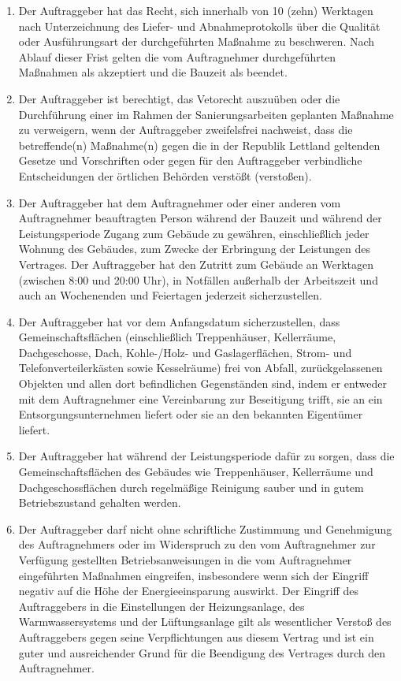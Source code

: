 \begin{multicols}{2}
\begin{enumerate}
   \item Der Auftraggeber hat das Recht, sich innerhalb von 10 (zehn) Werktagen nach Unterzeichnung des Liefer- und Abnahmeprotokolls über die Qualität oder Ausführungsart der durchgeführten Maßnahme zu beschweren. Nach Ablauf dieser Frist gelten die vom Auftragnehmer durchgeführten Maßnahmen als akzeptiert und die Bauzeit als beendet.
   \item Der Auftraggeber ist berechtigt, das Vetorecht auszuüben oder die Durchführung einer im Rahmen der Sanierungsarbeiten geplanten Maßnahme zu verweigern, wenn der Auftraggeber zweifelsfrei nachweist, dass die betreffende(n) Maßnahme(n) gegen die in der Republik Lettland geltenden Gesetze und Vorschriften oder gegen für den Auftraggeber verbindliche Entscheidungen der örtlichen Behörden verstößt (verstoßen).
   \item Der Auftraggeber hat dem Auftragnehmer oder einer anderen vom Auftragnehmer beauftragten Person während der Bauzeit und während der Leistungsperiode Zugang zum Gebäude zu gewähren, einschließlich jeder Wohnung des Gebäudes, zum Zwecke der Erbringung der Leistungen des Vertrages. Der Auftraggeber hat den Zutritt zum Gebäude an Werktagen (zwischen 8:00 und 20:00 Uhr), in Notfällen außerhalb der Arbeitszeit und auch an Wochenenden und Feiertagen jederzeit sicherzustellen.
   \item Der Auftraggeber hat vor dem Anfangsdatum sicherzustellen, dass Gemeinschaftsflächen (einschließlich Treppenhäuser, Kellerräume, Dachgeschosse, Dach, Kohle-/Holz- und Gaslagerflächen, Strom- und Telefonverteilerkästen sowie Kesselräume) frei von Abfall, zurückgelassenen Objekten und allen dort befindlichen Gegenständen sind, indem er entweder mit dem Auftragnehmer eine Vereinbarung zur Beseitigung trifft, sie an ein Entsorgungsunternehmen liefert oder sie an den bekannten Eigentümer liefert.
   \item Der Auftraggeber hat während der Leistungsperiode dafür zu sorgen, dass die Gemeinschaftsflächen des Gebäudes wie Treppenhäuser, Kellerräume und Dachgeschossflächen durch regelmäßige Reinigung sauber und in gutem Betriebszustand gehalten werden.
   \item Der Auftraggeber darf nicht ohne schriftliche Zustimmung und Genehmigung des Auftragnehmers oder im Widerspruch zu den vom Auftragnehmer zur Verfügung gestellten Betriebsanweisungen in die vom Auftragnehmer eingeführten Maßnahmen eingreifen, insbesondere wenn sich der Eingriff negativ auf die Höhe der Energieeinsparung auswirkt. Der Eingriff des Auftraggebers in die Einstellungen der Heizungsanlage, des Warmwassersystems und der Lüftungsanlage gilt als wesentlicher Verstoß des Auftraggebers gegen seine Verpflichtungen aus diesem Vertrag und ist ein guter und ausreichender Grund für die Beendigung des Vertrages durch den Auftragnehmer.

\end{enumerate}
\end{multicols}
